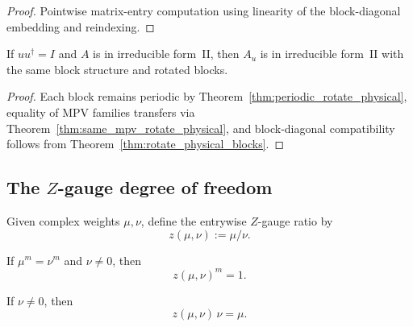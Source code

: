 \begin{proof}\leanok
    Pointwise matrix-entry computation using linearity of
    the block-diagonal embedding and reindexing.
\end{proof}

\begin{theorem}%
    \label{thm:irreducible_form_rotate_physical}
    \leanok
    If $u u^\dagger = I$ and $A$ is in irreducible form~II, then
    $A_u$ is in irreducible form~II with the same block structure and
    rotated blocks.
\end{theorem}

\begin{proof}\leanok
    Each block remains periodic by
    Theorem~\ref{thm:periodic_rotate_physical}, equality of MPV families
    transfers via Theorem~\ref{thm:same_mpv_rotate_physical}, and
    block-diagonal compatibility follows from
    Theorem~\ref{thm:rotate_physical_blocks}.
\end{proof}

\subsection{The \texorpdfstring{$Z$}{Z}-gauge degree of freedom}

\begin{definition}\label{def:z_gauge_entry}
    \leanok
    Given complex weights $\mu,\nu$, define the entrywise
    \(Z\)-gauge ratio by
    \[
        z(\mu,\nu) := \mu/\nu.
    \]
\end{definition}

\begin{lemma}\label{lem:z_gauge_entry_pow}
    \leanok
    If $\mu^m=\nu^m$ and $\nu\neq 0$, then
    \[
        z(\mu,\nu)^m = 1.
    \]
\end{lemma}

\begin{lemma}\label{lem:z_gauge_entry_mul}
    \leanok
    If $\nu\neq 0$, then
    \[
        z(\mu,\nu)\,\nu=\mu.
    \]
\end{lemma}


